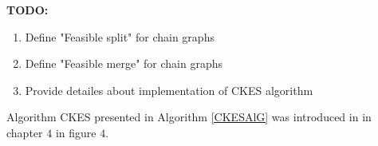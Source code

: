 %
%
%


\textbf{TODO:}
\begin{enumerate}
	\item Define "Feasible split" for chain graphs
	\item Define "Feasible merge" for chain graphs
	\item Provide detailes about implementation of CKES algorithm
\end{enumerate}

Algorithm CKES presented in Algorithm \ref{CKESAlG} was introduced in \cite{CKES} in chapter $4$ in figure $4$.

